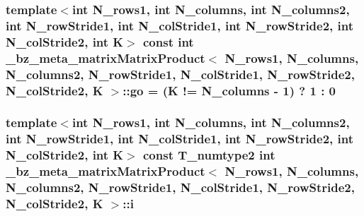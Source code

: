 \subsubsection[{go}]{\setlength{\rightskip}{0pt plus 5cm}template$<$int N\+\_\+rows1, int N\+\_\+columns, int N\+\_\+columns2, int N\+\_\+row\+Stride1, int N\+\_\+col\+Stride1, int N\+\_\+row\+Stride2, int N\+\_\+col\+Stride2, int K$>$ const int {\bf \+\_\+bz\+\_\+meta\+\_\+matrix\+Matrix\+Product}$<$ N\+\_\+rows1, N\+\_\+columns, N\+\_\+columns2, N\+\_\+row\+Stride1, N\+\_\+col\+Stride1, N\+\_\+row\+Stride2, N\+\_\+col\+Stride2, K $>$\+::go = (K != N\+\_\+columns -\/ 1) ? 1 \+: 0\hspace{0.3cm}{\ttfamily [static]}}\label{class__bz__meta__matrixMatrixProduct_acec73c7d5ead254daf02083688c23398}
\hypertarget{class__bz__meta__matrixMatrixProduct_a02729718fa4999d36b6dc932dff9fedc}{}
\subsubsection[{i}]{\setlength{\rightskip}{0pt plus 5cm}template$<$int N\+\_\+rows1, int N\+\_\+columns, int N\+\_\+columns2, int N\+\_\+row\+Stride1, int N\+\_\+col\+Stride1, int N\+\_\+row\+Stride2, int N\+\_\+col\+Stride2, int K$>$ const T\+\_\+numtype2 int {\bf \+\_\+bz\+\_\+meta\+\_\+matrix\+Matrix\+Product}$<$ N\+\_\+rows1, N\+\_\+columns, N\+\_\+columns2, N\+\_\+row\+Stride1, N\+\_\+col\+Stride1, N\+\_\+row\+Stride2, N\+\_\+col\+Stride2, K $>$\+::i}\label{class__bz__meta__matrixMatrixProduct_a02729718fa4999d36b6dc932dff9fedc}
\hypertarget{class__bz__meta__matrixMatrixProduct_a1dcd8bc4716cac12f2579278f88a6ebe}{}
